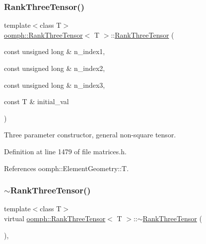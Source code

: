 \subsubsection{\texorpdfstring{Rank\+Three\+Tensor()}{RankThreeTensor()}\hspace{0.1cm}{\footnotesize\ttfamily [5/5]}}
{\footnotesize\ttfamily template$<$class T$>$ \\
\hyperlink{classoomph_1_1RankThreeTensor}{oomph\+::\+Rank\+Three\+Tensor}$<$ T $>$\+::\hyperlink{classoomph_1_1RankThreeTensor}{Rank\+Three\+Tensor} (\begin{DoxyParamCaption}\item[{const unsigned long \&}]{n\+\_\+index1,  }\item[{const unsigned long \&}]{n\+\_\+index2,  }\item[{const unsigned long \&}]{n\+\_\+index3,  }\item[{const T \&}]{initial\+\_\+val }\end{DoxyParamCaption})\hspace{0.3cm}{\ttfamily [inline]}}



Three parameter constructor, general non-\/square tensor. 



Definition at line 1479 of file matrices.\+h.



References oomph\+::\+Element\+Geometry\+::T.

\mbox{\label{classoomph_1_1RankThreeTensor_a19b8797a792309e78106dbb2d90f83a7}} 
\subsubsection{\texorpdfstring{$\sim$\+Rank\+Three\+Tensor()}{~RankThreeTensor()}}
{\footnotesize\ttfamily template$<$class T$>$ \\
virtual \hyperlink{classoomph_1_1RankThreeTensor}{oomph\+::\+Rank\+Three\+Tensor}$<$ T $>$\+::$\sim$\hyperlink{classoomph_1_1RankThreeTensor}{Rank\+Three\+Tensor} (\begin{DoxyParamCaption}{ }\end{DoxyParamCaption})\hspace{0.3cm}{\ttfamily [inline]}, {\ttfamily [virtual]}}



